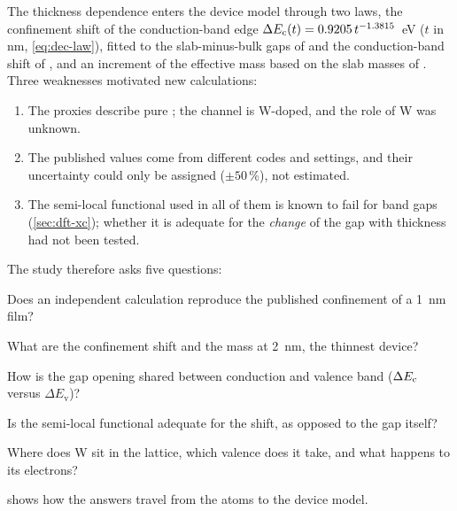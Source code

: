 The thickness dependence enters the device model through two laws, the confinement shift of the conduction-band edge
$\Delta E_{\mathrm{c}}(t) = 0.9205\,t^{-1.3815}$~eV ($t$ in nm, \cref{eq:dec-law}), fitted to the slab-minus-bulk gaps of
\citet[p.~21542]{Lin2022} and the conduction-band shift of \citet[p.~504]{Si2021}, and an increment of the effective mass
based on the slab masses of \citet[p.~21540]{Lin2022}. Three weaknesses motivated new calculations:
\begin{enumerate}
\item The proxies describe pure \InO; the channel is W-doped, and the role of W was unknown.
\item The published values come from different codes and settings, and their uncertainty could only be assigned
($\pm50$\,\%), not estimated.
\item The semi-local functional used in all of them is known to fail for band gaps (\cref{sec:dft-xc}); whether it is
adequate for the \emph{change} of the gap with thickness had not been tested.
\end{enumerate}

The study therefore asks five questions:
\begin{description}[leftmargin=1.2em]
\item[Q1] Does an independent calculation reproduce the published confinement of a 1~nm film?
\item[Q2] What are the confinement shift and the mass at 2~nm, the thinnest device?
\item[Q3] How is the gap opening shared between conduction and valence band ($\Delta E_{\mathrm{c}}$ versus $\Delta E_{\mathrm{v}}$)?
\item[Q4] Is the semi-local functional adequate for the shift, as opposed to the gap itself?
\item[Q5] Where does W sit in the lattice, which valence does it take, and what happens to its electrons?
\end{description}
 shows how the answers travel from the atoms to the device model.

